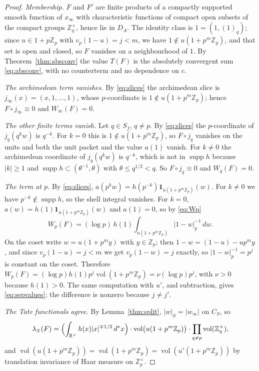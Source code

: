 \documentclass[11pt]{amsart}
\theoremstyle{definition}
\theoremstyle{remark}
\newcommand{\R}{\mathbb R}
\newcommand{\Z}{\mathbb Z}
\newcommand{\dstar}{\,d^{*}}
\newcommand{\supp}{\operatorname{supp}}
\newcommand{\vol}{\operatorname{vol}}
\newcommand{\DA}{D_A}
\begin{document}
\begin{proof}
\emph{Membership.}  $F$ and $F'$ are finite products of a compactly supported
smooth function of $x_{\infty}$ with characteristic functions of compact open
subsets of the compact groups $\Z_q^{\times}$, hence lie in $\DA$.  The
identity class is $1=(1,(1)_q)$; since $u\in1+p\Z_p$ with $v_p(1-u)=j<m$, we
have $1\notin u(1+p^{m}\Z_p)$, and that set is open and closed, so $F$ vanishes
on a neighbourhood of $1$.  By Theorem~\ref{thm:absconv} the value $T(F)$ is
the absolutely convergent sum \eqref{eq:absconv}, with no counterterm and no
dependence on $c$.

\emph{The archimedean term vanishes.}  By \eqref{eq:slices} the archimedean
slice is $j_{\infty}(x)=(x,1,\dots,1)$, whose $p$-coordinate is
$1\notin u(1+p^{m}\Z_p)$; hence $F\circ j_{\infty}\equiv0$ and $W_{\infty}(F)=0$.

\emph{The other finite terms vanish.}  Let $q\in S_f$, $q\ne p$.  By
\eqref{eq:slices} the $p$-coordinate of $j_q(q^{k}w)$ is $q^{-k}$.  For $k=0$
this is $1\notin u(1+p^{m}\Z_p)$, so $F\circ j_q$ vanishes on the units and
both the unit packet and the value $a(1)$ vanish.  For $k\ne0$ the
archimedean coordinate of $j_q(q^kw)$ is $q^{-k}$, which is not in $\supp h$
because $|k|\ge1$ and $\supp h\subset(\theta^{-1},\theta)$ with
$\theta\le q^{1/2}<q$.  So $F\circ j_q\equiv0$ and $W_q(F)=0$.

\emph{The term at $p$.}  By \eqref{eq:slices},
$a(p^{k}w)=h(p^{-k})\mathbf 1_{u(1+p^{m}\Z_p)}(w)$.  For $k\ne0$ we have
$p^{-k}\notin\supp h$, so the shell integral vanishes.  For $k=0$,
$a(w)=h(1)\mathbf 1_{u(1+p^{m}\Z_p)}(w)$ and $a(1)=0$, so by \eqref{eq:Wp}
\[
W_p(F)=(\log p)\,h(1)\int_{u(1+p^{m}\Z_p)}|1-w|_p^{-1}\,dw .
\]
On the coset write $w=u(1+p^{m}y)$ with $y\in\Z_p$; then $1-w=(1-u)-up^{m}y$,
and since $v_p(1-u)=j<m$ we get $v_p(1-w)=j$ exactly, so $|1-w|_p^{-1}=p^{j}$
is constant on the coset.  Therefore
$W_p(F)=(\log p)h(1)p^{j}\vol(1+p^{m}\Z_p)=\nu(\log p)p^{j}$, with $\nu>0$
because $h(1)>0$.  The same computation with $u'$, and subtraction, gives
\eqref{eq:sepvalues}; the difference is nonzero because $j\ne j'$.

\emph{The Tate functionals agree.}  By Lemma~\ref{thm:split}, $|w|_S=|w_\infty|$
on $C_S$, so
\[
\lambda_{\mp}(F)=\Bigl(\int_{\R^{\times}}h(x)|x|^{\mp1/2}\dstar x\Bigr)
\cdot\vol\bigl(u(1+p^{m}\Z_p)\bigr)\cdot\prod_{q\ne p}\vol(\Z_q^{\times}),
\]
and $\vol(u(1+p^{m}\Z_p))=\vol(1+p^{m}\Z_p)=\vol(u'(1+p^{m}\Z_p))$ by
translation invariance of Haar measure on $\Z_p^{\times}$.
\end{proof}
\end{document}

